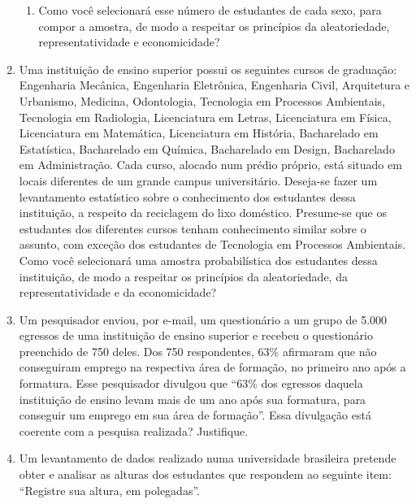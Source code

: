 \begin{enumerate}[label=\emph{\arabic*})]
\begin{enumerate}[label=\emph{\alph*})]
		      \item Como você selecionará esse número de estudantes de cada sexo, para compor a
		            amostra, de modo a respeitar os princípios da aleatoriedade, representatividade e
		            economicidade?

	      \end{enumerate}

	\item Uma instituição de ensino superior possui os seguintes cursos de graduação:
	      Engenharia Mecânica, Engenharia Eletrônica, Engenharia Civil, Arquitetura e Urbanismo,
	      Medicina, Odontologia, Tecnologia em Processos Ambientais, Tecnologia em Radiologia,
	      Licenciatura em Letras, Licenciatura em Física, Licenciatura em Matemática, Licenciatura
	      em História, Bacharelado em Estatística, Bacharelado em Química, Bacharelado em
	      Design, Bacharelado em Administração. Cada curso, alocado num prédio próprio, está
	      situado em locais diferentes de um grande campus universitário. Deseja-se fazer um
	      levantamento estatístico sobre o conhecimento dos estudantes dessa instituição, a respeito
	      da reciclagem do lixo doméstico. Presume-se que os estudantes dos diferentes cursos
	      tenham conhecimento similar sobre o assunto, com exceção dos estudantes de Tecnologia
	      em Processos Ambientais. Como você selecionará uma amostra probabilística dos
	      estudantes dessa instituição, de modo a respeitar os princípios da aleatoriedade, da
	      representatividade e da economicidade?


	\item Um pesquisador enviou, por e-mail, um questionário a um grupo de 5.000 egressos de
	      uma instituição de ensino superior e recebeu o questionário preenchido de 750 deles. Dos
	      750 respondentes, 63\% afirmaram que não conseguiram emprego na respectiva área de
	      formação, no primeiro ano após a formatura. Esse pesquisador divulgou que “63\% dos
	      egressos daquela instituição de ensino levam mais de um ano após sua formatura, para
	      conseguir um emprego em sua área de formação”. Essa divulgação está coerente com a
	      pesquisa realizada? Justifique.


	\item Um levantamento de dados realizado numa universidade brasileira pretende obter e
	      analisar as alturas dos estudantes que respondem ao seguinte item: “Registre sua altura,
	      em polegadas”.

	      \begin{enumerate}[label=\emph{\alph*})]


\end{enumerate}
\end{enumerate}
